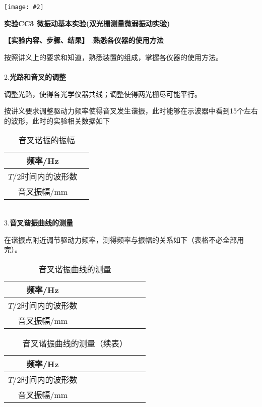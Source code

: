 \documentclass[11pt,a4paper]{ctexart}
\newcommand{\ExpeName}{实验CC3 微振动基本实验(双光栅测量微弱振动实验)}
\newcommand{\cpic}[2]{
\begin{center}
\texttt{[image: \#2]}
\end{center}
}
\begin{document}
\newpage%
\cpic{0.255}{e2}%
\begin{center}
\LARGE{\textbf{\ExpeName}}
\end{center}
\textbf{【实验内容、步骤、结果】}
.\textbf{熟悉各仪器的使用方法}\par
按照讲义上的要求和知道，熟悉装置的组成，掌握各仪器的使用方法。
\\
\ 
\\
2.\textbf{光路和音叉的调整}\par
调整光路，使得各光学仪器共线；调整使得两光栅尽可能平行。\par
按讲义要求调整驱动力频率使得音叉发生谐振，此时能够在示波器中看到15个左右的波形，此时的实验相关数据如下
\begin{table}[h!]
\centering
\caption{音叉谐振的振幅}
\begin{tabular}{|c|p{20mm}|}
\hline
频率/Hz &  \\ \hline
$T/2$时间内的波形数 &  \\ \hline
音叉振幅/mm &  \\ \hline
\end{tabular}
\end{table}
\newline
\ 
\\
3.\textbf{音叉谐振曲线的测量}\par
在谐振点附近调节驱动力频率，测得频率与振幅的关系如下（表格不必全部用完）。
\begin{table}[h!]
\centering
\caption{音叉谐振曲线的测量}
\begin{tabular}{|c|p{9mm}|p{9mm}|p{9mm}|p{9mm}|p{9mm}|p{9mm}|p{9mm}|p{9mm}|}
\hline
频率/Hz &  &  &  &  &  &  &  &  \\ \hline
$T/2$时间内的波形数 &  &  &  &  &  &  &  &  \\ \hline
音叉振幅/mm &  &  &  &  &  &  &  &  \\ \hline
\end{tabular}
\end{table}
\begin{table}[h!]
\centering
\caption{音叉谐振曲线的测量（续表）}
\begin{tabular}{|c|p{9mm}|p{9mm}|p{9mm}|p{9mm}|p{9mm}|p{9mm}|p{9mm}|p{9mm}|}
\hline
频率/Hz &  &  &  &  &  &  &  &  \\ \hline
$T/2$时间内的波形数 &  &  &  &  &  &  &  &  \\ \hline
音叉振幅/mm &  &  &  &  &  &  &  &  \\ \hline
\end{tabular}
\end{table}
\end{document}
